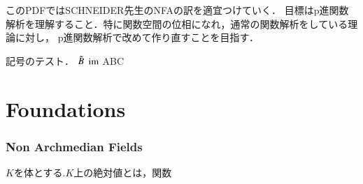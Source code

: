 \documentclass{ujarticle}
\begin{document}
このPDFではSCHNEIDER先生のNFAの訳を適宜つけていく．
目標はp進関数解析を理解すること．特に関数空間の位相になれ，通常の関数解析をしている理論に対し，
p進関数解析で改めて作り直すことを目指す．
\begin{rem}
 記号のテスト．
 $\tilde{B}{}$
 $\text{\rm im}$ ABC
\end{rem}

\part{Foundations}
\label{chap:Foundations}

\section{Non Archmedian Fields}
\label{sec:Non Archmedian Fields}
$K$を体とする.$K$上の絶対値とは，関数
\end{document}
